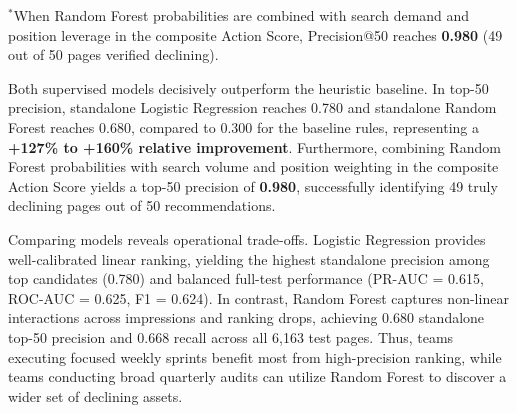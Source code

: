 \documentclass[conference]{IEEEtran}
\begin{document}
\begin{table}[htbp]
\caption{Model Performance on Unseen Client Websites ($N = 6,163$, Holdout Base Rate = 0.511)}
\label{tab:model_comparison}
\centering
\setlength{\tabcolsep}{2.5pt}
\par\vspace{2pt}
\parbox{0.96\columnwidth}{\scriptsize $^*$When Random Forest probabilities are combined with search demand and position leverage in the composite Action Score, Precision@50 reaches \textbf{0.980} (49 out of 50 pages verified declining).}
\end{table}

Both supervised models decisively outperform the heuristic baseline. In top-50 precision, standalone Logistic Regression reaches 0.780 and standalone Random Forest reaches 0.680, compared to 0.300 for the baseline rules, representing a \textbf{+127\% to +160\% relative improvement}. Furthermore, combining Random Forest probabilities with search volume and position weighting in the composite Action Score yields a top-50 precision of \textbf{0.980}, successfully identifying 49 truly declining pages out of 50 recommendations.

Comparing models reveals operational trade-offs. Logistic Regression provides well-calibrated linear ranking, yielding the highest standalone precision among top candidates (0.780) and balanced full-test performance (PR-AUC = 0.615, ROC-AUC = 0.625, F1 = 0.624). In contrast, Random Forest captures non-linear interactions across impressions and ranking drops, achieving 0.680 standalone top-50 precision and 0.668 recall across all 6,163 test pages. Thus, teams executing focused weekly sprints benefit most from high-precision ranking, while teams conducting broad quarterly audits can utilize Random Forest to discover a wider set of declining assets.
\end{document}
